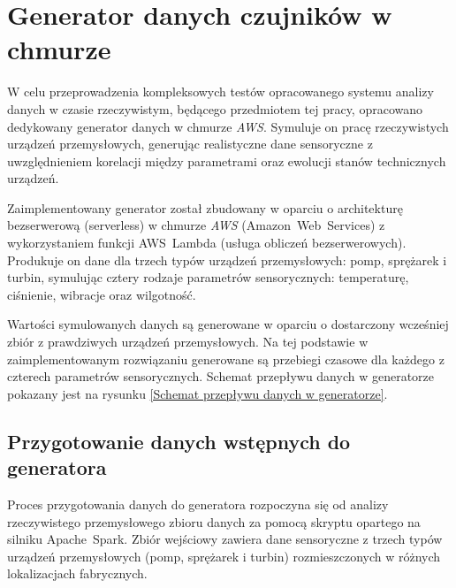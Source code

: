 \section{Generator danych czujników w chmurze}
\label{sec:implementacja_generowania}


W celu przeprowadzenia kompleksowych testów opracowanego systemu analizy danych w czasie rzeczywistym, będącego przedmiotem tej pracy, opracowano dedykowany generator danych w chmurze \textit{AWS}. Symuluje on pracę rzeczywistych urządzeń przemysłowych, generując realistyczne dane sensoryczne z uwzględnieniem korelacji między parametrami oraz ewolucji stanów technicznych urządzeń.

Zaimplementowany generator został zbudowany w oparciu o architekturę bezserwerową (serverless) w chmurze \textit{AWS} (\mbox{Amazon Web Services}) z wykorzystaniem funkcji \mbox{AWS Lambda} (usługa obliczeń bezserwerowych). Produkuje on dane dla trzech typów urządzeń przemysłowych: pomp, sprężarek i turbin, symulując cztery rodzaje parametrów sensorycznych: temperaturę, ciśnienie, wibracje oraz wilgotność.

Wartości symulowanych danych są generowane w oparciu o dostarczony wcześniej zbiór z prawdziwych urządzeń przemysłowych. Na tej podstawie w zaimplementowanym rozwiązaniu generowane są przebiegi czasowe dla każdego z czterech parametrów sensorycznych. Schemat przepływu danych w generatorze pokazany jest na rysunku \ref{Schemat przepływu danych w generatorze}.


\subsection{Przygotowanie danych wstępnych do generatora}

Proces przygotowania danych do generatora rozpoczyna się od analizy rzeczywistego przemysłowego zbioru danych za pomocą skryptu opartego na silniku \mbox{Apache Spark}. Zbiór wejściowy zawiera dane sensoryczne z trzech typów urządzeń przemysłowych (pomp, sprężarek i turbin) rozmieszczonych w różnych lokalizacjach fabrycznych.

